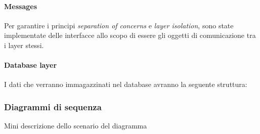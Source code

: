 \paragraph{Messages}
Per garantire i principi \textit{separation of concerns} e \textit{layer isolation}, sono state implementate delle interfacce allo scopo di essere gli oggetti di comunicazione tra i layer stessi.


\paragraph{Database layer}
I dati che verranno immagazzinati nel database avranno la seguente struttura:

\subsubsection{Diagrammi di sequenza}
Mini descrizione dello scenario del diagramma
